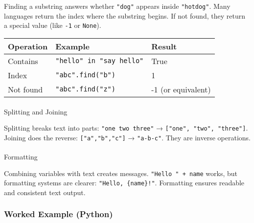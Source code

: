 \documentclass[
  letterpaper,
  DIV=11,
  numbers=noendperiod]{scrreprt}
\makeatletter
\let\oldparagraph\paragraph
\renewcommand{\paragraph}{
    \@ifstar
      \xxxParagraphStar
      \xxxParagraphNoStar
  }
\newcommand{\xxxParagraphStar}[1]{\oldparagraph*{#1}\mbox{}}
\newcommand{\xxxParagraphNoStar}[1]{\oldparagraph{#1}\mbox{}}
\makeatother
\begin{document}
Finding a substring answers whether \texttt{"dog"} appears inside
\texttt{"hotdog"}. Many languages return the index where the substring
begins. If not found, they return a special value (like \texttt{-1} or
\texttt{None}).

\begin{longtable}[]{@{}lll@{}}
\toprule\noalign{}
Operation & Example & Result \\
\midrule\noalign{}
\endhead
\bottomrule\noalign{}
\endlastfoot
Contains & \texttt{"hello"\ in\ "say\ hello"} & True \\
Index & \texttt{"abc".find("b")} & 1 \\
Not found & \texttt{"abc".find("z")} & -1 (or equivalent) \\
\end{longtable}

\paragraph{Splitting and Joining}\label{splitting-and-joining}

Splitting breaks text into parts: \texttt{"one\ two\ three"} →
\texttt{{[}"one",\ "two",\ "three"{]}}. Joining does the reverse:
\texttt{{[}"a","b","c"{]}} → \texttt{"a-b-c"}. They are inverse
operations.

\paragraph{Formatting}\label{formatting}

Combining variables with text creates messages.
\texttt{"Hello\ "\ +\ name} works, but formatting systems are clearer:
\texttt{"Hello,\ \{name\}!"}. Formatting ensures readable and consistent
text output.

\subsubsection{Worked Example (Python)}\label{worked-example-python-7}
\end{document}
